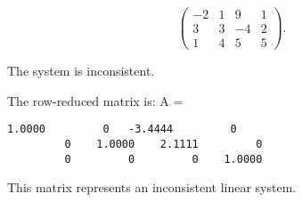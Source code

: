 \documentclass{ximera}
\begin{document}
\begin{computerExercise} \label{c2.3.1c}
\[
\left(\begin{array}{rrrr}
 -2 & 1 &  9 & 1\\
  3 & 3 & -4 & 2\\
  1 & 4 &  5 & 5
\end{array}\right).
\]

\begin{solution}
\ans The system is inconsistent.

\soln The row-reduced matrix is:
A = 
\begin{verbatim}
1.0000         0   -3.4444         0
         0    1.0000    2.1111         0
         0         0         0    1.0000
\end{verbatim}
This matrix represents an inconsistent linear system.


\end{solution}
\end{computerExercise}
\end{document}
